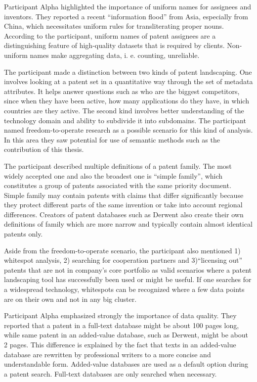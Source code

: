 Participant Alpha highlighted the importance of uniform names for assignees and inventors. 
They reported a recent ``information flood'' from Asia, especially from China, which necessitates uniform rules for transliterating proper nouns.
According to the participant, uniform names of patent assignees are a distinguishing feature of high-quality datasets that is required by clients.
Non-uniform names make aggregating data, i. e. counting, unreliable.

The participant made a distinction between two kinds of patent landscaping.
One involves looking at a patent set in a quantitative way through the set of metadata attributes.
It helps answer questions such as who are the biggest competitors, since when they have been active, how many applications do they have, in which countries are they active.
The second kind involves better understanding of the technology domain and ability to subdivide it into subdomains.
The participant named freedom-to-operate research as a possible scenario for this kind of analysis.
In this area they saw potential for use of semantic methods such as the contribution of this thesis.

The participant described multiple definitions of a patent family. 
The most widely accepted one and also the broadest one is ``simple family'', which constitutes a group of patents associated with the same priority document.
Simple family may contain patents with claims that differ significantly because they protect different parts of the same invention or take into account regional differences.
Creators of patent databases such as Derwent also create their own definitions of family which are more narrow and typically contain almost identical patents only.

Aside from the freedom-to-operate scenario, the participant also mentioned 1) whitespot analysis, 2) searching for cooperation partners and  3)``licensing out'' patents that are not in company’s core portfolio as valid scenarios where a patent landscaping tool has successfully been used or might be useful.
If one searches for a widespread technology, whitespots can be recognized where a few data points are on their own and not in any big cluster.

Participant Alpha emphasized strongly the importance of data quality. 
They reported that a patent in a full-text database might be about 100 pages long, while same patent in an added-value database, such as Derwent, might be about 2 pages.
This difference is explained by the fact that texts in an added-value database are rewritten by professional writers to a more concise and understandable form.
Added-value databases are used as a default option during a patent search.
Full-text databases are only searched when necessary.


